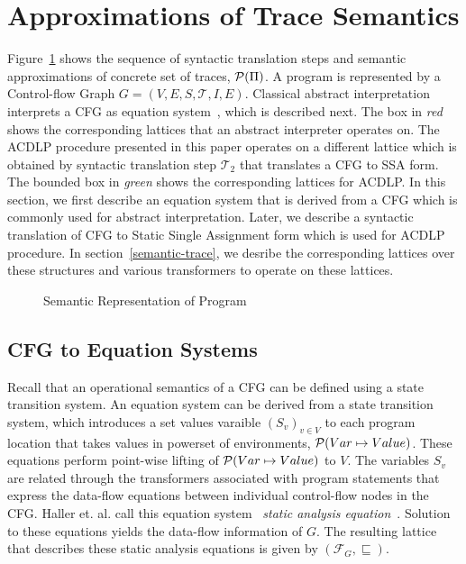 {\section{Approximations of Trace Semantics}
%
Figure~\ref{fig:semantic} shows the sequence of syntactic translation steps 
and semantic approximations of concrete set of traces, $\mathcal{P}(\Pi)$.  
A program is represented by a Control-flow Graph $G=(V,E,S,\mathcal{T},I,E)$.  
Classical abstract interpretation interprets a CFG as equation 
system~\cite{minepaper,Schmidt98,tacas12}, which is described next.  The box in 
\emph{red} shows the corresponding lattices that an abstract interpreter
operates on.  The ACDLP procedure presented in this paper operates on a
different lattice which is obtained by syntactic translation step
$\mathcal{T}_2$ that translates a CFG to SSA form. The bounded box in 
\emph{green} shows the corresponding lattices for ACDLP. In this section, 
we first describe an equation system that is derived from a CFG which is commonly
used for abstract interpretation.  Later, we describe a syntactic translation 
of CFG to Static Single Assignment form which is used for ACDLP procedure.   
In section~\ref{semantic-trace}, we desribe the corresponding lattices over 
these structures and various transformers to operate on these lattices. 
%
\begin{figure}[htbp]
\centering
{}
\caption{Semantic Representation of Program \label{fig:semantic}}
\end{figure}
%
%
\subsection{CFG to Equation Systems}
%
Recall that an operational semantics of a CFG can be defined using a 
state transition system. An equation 
system can be derived from a state transition system, which introduces a set
values varaible $(S_v)_{v \in V}$ to each program location that takes values in
powerset of environments, $\mathcal{P}(Var \mapsto Value)$.  These equations perform 
point-wise lifting of $\mathcal{P}(Var \mapsto Value)$ to $V$.   The variables $S_v$
are related through the transformers associated with program statements that express the 
data-flow equations between individual control-flow nodes in the CFG.  Haller
et. al. call this equation system~\cite{minepaper} 
\emph{static analysis equation}~\cite{tacas12}.  Solution to these equations 
yields the data-flow information of $G$.  The resulting lattice that describes 
these static analysis equations is given by $(\mathcal{F}_G, \sqsubseteq)$.   
%


}
